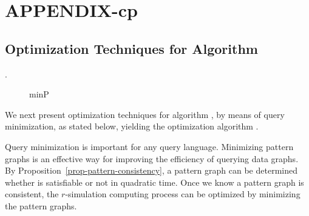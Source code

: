 \newpage
\addtolength{\parskip}{0.25cm}
\newpage
\section*{\Large \sf APPENDIX-cp}
\label{sec-proofs}



\subsection{Optimization Techniques for Algorithm \grouprec}.
%
\begin{figure}[tb!]
\vspace{2ex}
\begin{center}
{\small

\myhrule \vspace{-2ex}
\vspace{-2.5ex}

\myhrule
}
\end{center}
\vspace{-4ex}
\caption{minP} \label{minP-alg}
\vspace{-3ex}
\end{figure}

%
We next present optimization techniques for algorithm \grouprec, by means of query minimization, as stated below, yielding the optimization algorithm \grouprecopt.

Query minimization is important for any query language. Minimizing pattern graphs is an effective way for improving the efficiency of querying data graphs. By Proposition~\ref{prop-pattern-consistency}, a pattern graph can be determined whether is satisfiable or not in quadratic time. Once we know a pattern graph is consistent, the $r$-simulation computing process can be optimized by minimizing the pattern graphs.

